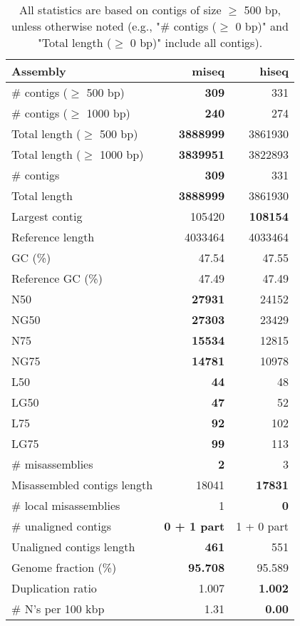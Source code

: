 \documentclass[12pt,a4paper]{article}
\begin{document}
\begin{table}[ht]
\begin{center}
\caption{All statistics are based on contigs of size $\geq$ 500 bp, unless otherwise noted (e.g., "\# contigs ($\geq$ 0 bp)" and "Total length ($\geq$ 0 bp)" include all contigs).}
\begin{tabular}{|l*{2}{|r}|}
\hline
Assembly & miseq & hiseq \\ \hline
\# contigs ($\geq$ 500 bp) & {\bf 309} & 331 \\ \hline
\# contigs ($\geq$ 1000 bp) & {\bf 240} & 274 \\ \hline
Total length ($\geq$ 500 bp) & {\bf 3888999} & 3861930 \\ \hline
Total length ($\geq$ 1000 bp) & {\bf 3839951} & 3822893 \\ \hline
\# contigs & {\bf 309} & 331 \\ \hline
Total length & {\bf 3888999} & 3861930 \\ \hline
Largest contig & 105420 & {\bf 108154} \\ \hline
Reference length & 4033464 & 4033464 \\ \hline
GC (\%) & 47.54 & 47.55 \\ \hline
Reference GC (\%) & 47.49 & 47.49 \\ \hline
N50 & {\bf 27931} & 24152 \\ \hline
NG50 & {\bf 27303} & 23429 \\ \hline
N75 & {\bf 15534} & 12815 \\ \hline
NG75 & {\bf 14781} & 10978 \\ \hline
L50 & {\bf 44} & 48 \\ \hline
LG50 & {\bf 47} & 52 \\ \hline
L75 & {\bf 92} & 102 \\ \hline
LG75 & {\bf 99} & 113 \\ \hline
\# misassemblies & {\bf 2} & 3 \\ \hline
Misassembled contigs length & 18041 & {\bf 17831} \\ \hline
\# local misassemblies & 1 & {\bf 0} \\ \hline
\# unaligned contigs & {\bf 0 + 1 part} & 1 + 0 part \\ \hline
Unaligned contigs length & {\bf 461} & 551 \\ \hline
Genome fraction (\%) & {\bf 95.708} & 95.589 \\ \hline
Duplication ratio & 1.007 & {\bf 1.002} \\ \hline
\# N's per 100 kbp & 1.31 & {\bf 0.00} \\ \hline

\end{tabular}
\end{center}
\end{table}
\end{document}
